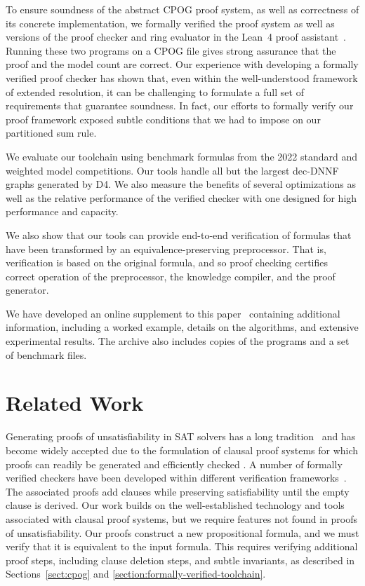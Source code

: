 \documentclass[letterpaper,USenglish,cleveref, autoref, thm-restate]{lipics-v2021}
\newcommand{\progname}[1]{\textsc{#1}}
\newcommand{\dfour}{\progname{D4}}
\newcommand{\lean}{Lean~4}
\begin{document}
To ensure soundness of the abstract CPOG proof system, as well as
correctness of its concrete implementation, we formally verified the
proof system as well as versions of the proof checker and ring
evaluator in the \lean{} proof assistant~\cite{demoura:cade:2021}.
Running these two programs on a  CPOG file gives strong
assurance that the proof and the model count are correct. Our
experience with developing a formally verified proof checker has shown
that, even within the well-understood framework of extended
resolution, it can be challenging to formulate a full set of
requirements that guarantee soundness.  In fact, our efforts to
formally verify our proof framework exposed subtle conditions that we had
to impose on our partitioned sum rule.

We evaluate our toolchain using benchmark formulas from the 2022
standard and weighted model competitions.  Our tools handle all but
the largest dec-DNNF graphs generated by \dfour{}.  We also measure
the benefits of several optimizations as well as the relative
performance of the verified checker with one designed for high
performance and capacity.

We also show that our tools can provide end-to-end verification of
formulas that have been transformed by an equivalence-preserving
preprocessor.  That is, verification is based on the original formula,
and so proof checking certifies correct operation of the preprocessor,
the knowledge compiler, and the proof generator.

We have developed an online supplement to this
paper~\cite{bryant:sat:2023:supplement} containing additional
information, including a worked example, details on the algorithms,
and extensive experimental results.  The archive also includes copies
of the programs and a set of benchmark files.


\section{Related Work}


Generating proofs of unsatisfiability in SAT solvers has a long
tradition~\cite{ZhangMalik} and has become widely accepted due to the
formulation of clausal proof systems for which proofs can readily be
generated and efficiently checked
\cite{heule:cade:2013,wetzler14_drattrim}.
A number of formally verified checkers have been developed within different verification frameworks~\cite{cruz-cade-2017,lrat,Lammich:20,Tan:2021}.
The associated proofs add clauses while preserving satisfiability until the empty clause is derived.
Our work builds on the well-established technology and tools associated with clausal proof systems,
but we require features not found in proofs of unsatisfiability.
Our proofs construct a new propositional formula, and we must verify
that it
is equivalent to the input formula.  This requires verifying
additional proof steps, including clause deletion steps, and subtle
invariants, as described in Sections~\ref{sect:cpog} and
\ref{section:formally-verified-toolchain}.
\end{document}
